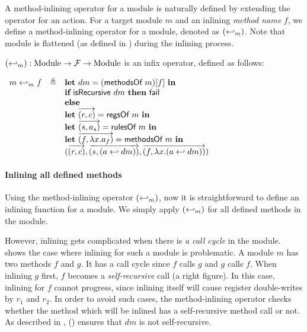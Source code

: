 A method-inlining operator for a module is naturally defined by
extending the operator for an action. For a target module $m$ and an
inlining \emph{method name} $f$, we define a method-inlining operator
for a module, denoted as $(\hookleftarrow_{m})$. Note that module is
flattened (as defined in ) during the inlining
process.

\begin{definition}
  \label{def-inlinedmm}
  $(\hookleftarrow_{m}) : \textrm{Module} \to \mathcal{F}{} \to
  \textrm{Module}$ is an infix operator, defined as follows:
  \begin{center}
    \begin{math}
      \begin{array}{rcl}
        \inlinedmm{m}{f} & \triangleq & \pgmlet{} dm = (\methsofm{m})[f]\ \pgmin{} \\
        & & \pgmif{} \isrec{dm}\ \pgmthen{} \fail{} \\
        & & \pgmelse{} \\
        & & \pgmlet{} \listof{\regpair{r}{c}} = \regsofm{m}\ \pgmin{} \\
        & & \pgmlet{} \listof{\rulepair{s}{a_s}} = \rulesofm{m}\ \pgmin{} \\
        & & \pgmlet{} \listof{\methodpair{f}{\lambda x.a_f}} = \methsofm{m}\ \pgmin{} \\
        & & \modbasic{\regpair{r}{c}}
                  {\rulepair{s}{(\inlinedm{a}{dm})}}
                  {\methodpair{f}{\lambda x.(\inlinedm{a}{dm})}} \\
      \end{array}
    \end{math}
  \end{center}
\end{definition}

\paragraph{Inlining all defined methods}

Using the method-inlining operator $(\hookleftarrow_{m})$, now it is
straightforward to define an inlining function for a module. We simply
apply $(\hookleftarrow_{m})$ for all defined methods in the module.

However, inlining gets complicated when there is \emph{a call cycle}
in the module.  shows the case where
inlining for such a module is problematic. A module $m$ has two
methods $f$ and $g$. It has a call cycle since $f$ calls $g$ and $g$
calls $f$. When inlining $g$ first, $f$ becomes a
\emph{self-recursive} call (a right figure). In this case, inlining
for $f$ cannot progress, since inlining itself will cause register
double-writes by $r_1$ and $r_2$. In order to avoid such cases, the
method-inlining operator checks whether the method which will be
inlined has a self-recursive method call or not. As described in
, () ensures that $dm$ is not
self-recursive.

